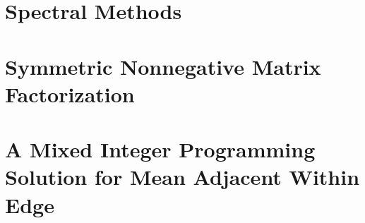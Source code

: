 \documentclass{report}
\begin{document}
\chapter{Spectral Methods}


\chapter{Symmetric Nonnegative Matrix Factorization}


\chapter{A Mixed Integer Programming Solution for Mean Adjacent Within Edge}




\end{document}
